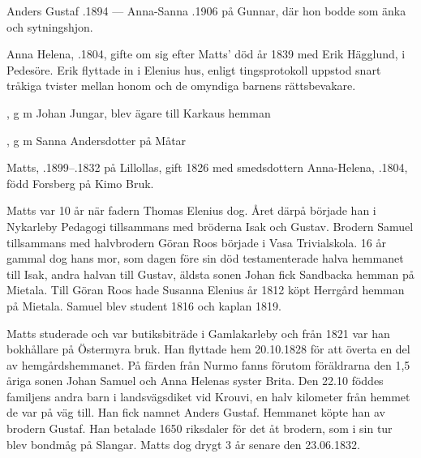 Anders Gustaf .1894  ---  Anna-Sanna .1906 på Gunnar, där hon bodde som änka och sytningshjon.


%
Anna Helena, .1804, gifte om sig efter Matts' död år 1839 med Erik Hägglund,  i Pedesöre. Erik flyttade in i Elenius hus, enligt tingsprotokoll uppstod snart tråkiga tvister mellan honom och de omyndiga barnens rättsbevakare.
\begin{jhchildren}
  \item {}
  \item {}, g m Johan Jungar, blev ägare till Karkaus hemman
  \item {}, g m Sanna Andersdotter på Måtar
\end{jhchildren}


%
Matts, .1899--.1832 på Lillollas, gift 1826 med smedsdottern Anna-Helena, .1804, född Forsberg på Kimo Bruk.
\begin{jhchildren}
  \item {}
  \item {}
  \item {}
\end{jhchildren}
Matts var 10 år när fadern Thomas Elenius dog. Året därpå började han i Nykarleby Pedagogi tillsammans med bröderna Isak och Gustav. Brodern Samuel tillsammans med halvbrodern Göran Roos började i Vasa Trivialskola. 16 år gammal dog hans mor, som dagen före sin död testamenterade halva hemmanet till Isak, andra halvan till Gustav, äldsta sonen Johan fick Sandbacka hemman på Mietala. Till Göran Roos hade Susanna Elenius år 1812 köpt Herrgård hemman på Mietala. Samuel blev student 1816 och kaplan 1819.

Matts studerade och var butiksbiträde i Gamlakarleby och från 1821 var han bokhållare på Östermyra bruk. Han flyttade hem 20.10.1828 för att överta en del av hemgårdshemmanet. På färden från Nurmo fanns förutom föräldrarna den 1,5 åriga sonen Johan Samuel och Anna Helenas syster Brita. Den 22.10 föddes familjens andra barn i landsvägsdiket vid 	Krouvi, en halv kilometer från hemmet de var på väg till. Han fick namnet Anders Gustaf. Hemmanet köpte han av brodern 	Gustaf. Han betalade 1650 riksdaler för det åt brodern, som i sin tur blev bondmåg på Slangar. Matts dog drygt 3 år senare den 23.06.1832.


